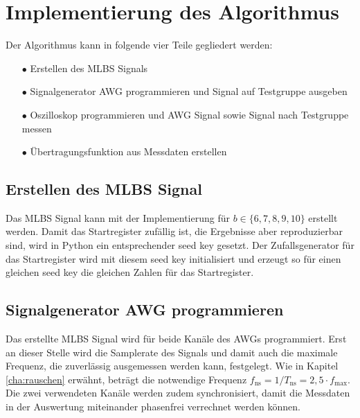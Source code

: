 \documentclass[12pt,report,final,twoside,accentcolor=tud9b,bigchapter]{tudreport}
\begin{document}
\section{Implementierung des Algorithmus}
Der Algorithmus kann in folgende vier Teile gegliedert werden:
\begin{enumerate}
\item[$\bullet$] Erstellen des MLBS Signals
\item[$\bullet$] Signalgenerator AWG programmieren und Signal auf Testgruppe ausgeben
\item[$\bullet$] Oszilloskop programmieren und AWG Signal sowie Signal nach Testgruppe messen
\item[$\bullet$] Übertragungsfunktion aus Messdaten erstellen
\end{enumerate}

\subsection{Erstellen des MLBS Signal}
Das MLBS Signal kann mit der Implementierung für $b \in \{6,7, 8, 9, 10\}$ erstellt werden.
Damit das Startregister zufällig ist, die Ergebnisse aber reproduzierbar sind, wird in Python ein entsprechender seed key gesetzt. Der Zufallsgenerator für das Startregister wird mit diesem seed key initialisiert und erzeugt so für einen gleichen seed key die gleichen Zahlen für das Startregister. 

\subsection{Signalgenerator AWG programmieren}
Das erstellte MLBS Signal wird für beide Kanäle des AWGs programmiert. Erst an dieser Stelle wird die Samplerate des Signals und damit auch die maximale Frequenz, die zuverlässig ausgemessen werden kann, festgelegt. Wie in Kapitel \ref{cha:rauschen} erwähnt, beträgt die notwendige Frequenz $f_\textrm{ns}=1/T_\textrm{ns}=2,5\cdot f_\textrm{max}$.
Die zwei verwendeten Kanäle werden zudem synchronisiert, damit die Messdaten in der Auswertung miteinander phasenfrei verrechnet werden können.
\end{document}
